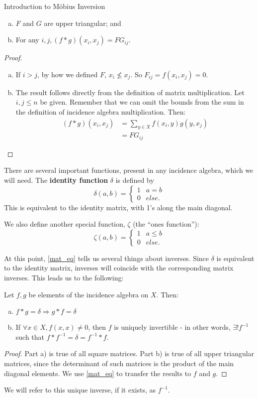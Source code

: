 \documentclass[12pt]{pom_thesis}
\begin{document}
\begin{chapter}{Introduction to M\"obius Inversion}
\begin{lemma}
\begin{enumerate}[a)]
\item $F$ and $G$ are upper triangular; and
\item For any $i,j, (f * g)(x_i, x_j)=FG_{ij}$.
\end{enumerate}
\end{lemma}
\begin{proof}
\begin{enumerate}[a)]
\item If $i>j$, by how we defined $F$, $x_i \nleq x_j$. So $F_{ij} = f(x_i, x_j) = 0$. 
\item
The result follows directly from the definition of matrix multiplication. Let $i,j\leq n$ be given. Remember that we can omit the bounds from the sum in the definition of incidence algebra multiplication. Then:
\begin{align*}
(f * g)(x_i, x_j) &= \sum_{y \in X} f(x_i,y)g(y,x_j)\\
&=FG_{ij}
\end{align*}
\end{enumerate}
\end{proof}


There are several important functions, present in any incidence algebra, which we will need. 
The \textbf{identity function} $\delta$ is defined by 
\[\delta(a,b) = \begin{cases} 1 & a = b \\ 0 & else. \end{cases}
\]
This is equivalent to the identity matrix, with 1's along the main diagonal.

We also define another special function, $\zeta$ (the ``ones function''):
\[
\zeta(a,b) = \begin{cases} 1 & a \leq b \\ 0 & else. \end{cases}
\]

At this point, \ref{mat_eq} tells us several things about inverses. Since $\delta$ is equivalent to the identity matrix, inverses will coincide with the corresponding matrix inverses. This leads us to the following:
\begin{cor}\label{cor_inv}
Let $f,g$ be elements of the incidence algebra on $X$. Then:
\begin{enumerate}[a)]
\item $f*g = \delta \Rightarrow g*f = \delta$
\item If $\forall x \in X, f(x,x) \neq 0$, then $f$ is uniquely invertible - in other words, $\exists! f^{-1}$ such that $f*f^{-1} = \delta = f^{-1} * f$.
\end{enumerate}
\end{cor}
\begin{proof}
Part a) is true of all square matrices. Part b) is true of all upper triangular matrices, since the determinant of such matrices is the product of the main diagonal elements. We use \ref{mat_eq} to transfer the results to $f$ and $g$.
\end{proof}
We will refer to this unique inverse, if it exists, as $f^{-1}$. 


\end{chapter}
\end{document}

